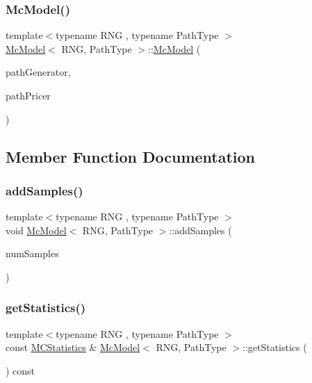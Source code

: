 \subsubsection{\texorpdfstring{Mc\+Model()}{McModel()}}
{\footnotesize\ttfamily template$<$typename R\+NG , typename Path\+Type $>$ \\
\hyperlink{class_mc_model}{Mc\+Model}$<$ R\+NG, Path\+Type $>$\+::\hyperlink{class_mc_model}{Mc\+Model} (\begin{DoxyParamCaption}\item[{const std\+::shared\+\_\+ptr$<$ \hyperlink{class_path_generator}{Path\+Generator}$<$ R\+NG, Path\+Type $>$$>$ \&}]{path\+Generator,  }\item[{const std\+::shared\+\_\+ptr$<$ \hyperlink{class_path_pricer}{Path\+Pricer}$<$ Path\+Type $>$$>$}]{path\+Pricer }\end{DoxyParamCaption})}



\subsection{Member Function Documentation}
\hypertarget{class_mc_model_a6ce369cb607a221259e4a93bb63ea4ec}{}\label{class_mc_model_a6ce369cb607a221259e4a93bb63ea4ec} 
\subsubsection{\texorpdfstring{add\+Samples()}{addSamples()}}
{\footnotesize\ttfamily template$<$typename R\+NG , typename Path\+Type $>$ \\
void \hyperlink{class_mc_model}{Mc\+Model}$<$ R\+NG, Path\+Type $>$\+::add\+Samples (\begin{DoxyParamCaption}\item[{unsigned long}]{num\+Samples }\end{DoxyParamCaption})}

\hypertarget{class_mc_model_a07af7562a83c0bc16ba822ac52154684}{}\label{class_mc_model_a07af7562a83c0bc16ba822ac52154684} 
\subsubsection{\texorpdfstring{get\+Statistics()}{getStatistics()}}
{\footnotesize\ttfamily template$<$typename R\+NG , typename Path\+Type $>$ \\
const \hyperlink{class_m_c_statistics}{M\+C\+Statistics} \& \hyperlink{class_mc_model}{Mc\+Model}$<$ R\+NG, Path\+Type $>$\+::get\+Statistics (\begin{DoxyParamCaption}{ }\end{DoxyParamCaption}) const}



